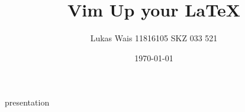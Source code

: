 \documentclass[a4paper]{article}
\title{Vim Up your \LaTeX}
\author{Lukas Wais 11816105 SKZ 033 521}
\date{\today}
\begin{document}
	\maketitle
	{presentation}
\end{document}
